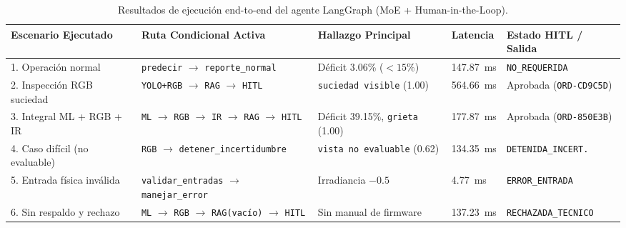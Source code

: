\documentclass[12pt,a4paper]{article}
\begin{document}
\begin{table}[H]
\centering
\caption{Resultados de ejecución end-to-end del agente LangGraph (MoE + Human-in-the-Loop).}
\label{tab:res_agent}
\scriptsize
\begin{tabular}{p{3.6cm}p{3.0cm}p{2.2cm}p{1.6cm}p{3.1cm}}
\toprule
\textbf{Escenario Ejecutado} & \textbf{Ruta Condicional Activa} & \textbf{Hallazgo Principal} & \textbf{Latencia} & \textbf{Estado HITL / Salida} \\
\midrule
1. Operación normal & \texttt{predecir} $\rightarrow$ \texttt{reporte\_normal} & Déficit 3.06\% ($<15\%$) & 147.87~ms & \texttt{NO\_REQUERIDA} \\
2. Inspección RGB suciedad & \texttt{YOLO+RGB} $\rightarrow$ \texttt{RAG} $\rightarrow$ \texttt{HITL} & \texttt{suciedad visible} (1.00) & 564.66~ms & Aprobada (\texttt{ORD-CD9C5D}) \\
3. Integral ML + RGB + IR & \texttt{ML} $\rightarrow$ \texttt{RGB} $\rightarrow$ \texttt{IR} $\rightarrow$ \texttt{RAG} $\rightarrow$ \texttt{HITL} & Déficit 39.15\%, \texttt{grieta} (1.00) & 177.87~ms & Aprobada (\texttt{ORD-850E3B}) \\
4. Caso difícil (no evaluable) & \texttt{RGB} $\rightarrow$ \texttt{detener\_incertidumbre} & \texttt{vista no evaluable} (0.62) & 134.35~ms & \texttt{DETENIDA\_INCERT.} \\
5. Entrada física inválida & \texttt{validar\_entradas} $\rightarrow$ \texttt{manejar\_error} & Irradiancia $-0.5$ & 4.77~ms & \texttt{ERROR\_ENTRADA} \\
6. Sin respaldo y rechazo & \texttt{ML} $\rightarrow$ \texttt{RGB} $\rightarrow$ \texttt{RAG(vacío)} $\rightarrow$ \texttt{HITL} & Sin manual de firmware & 137.23~ms & \texttt{RECHAZADA\_TECNICO} \\
\bottomrule
\end{tabular}
\end{table}

\end{document}
